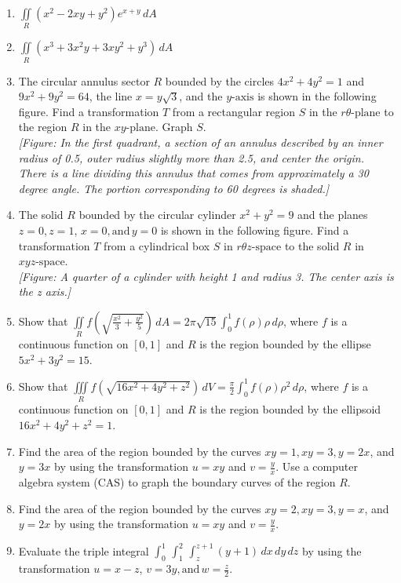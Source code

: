 \documentclass{exercises}
\begin{document}
\begin{enumerate}[resume]
\item $\underset{R}{\iint}(x^{2}-2xy+y^{2})e^{x+y}\,dA$
\item $\underset{R}{\iint}(x^{3}+3x^{2}y+3xy^{2}+y^{3})\,dA$
\item The circular annulus sector $R$ bounded by the circles $4x^{2}+4y^{2}=1$ and $9x^{2}+9y^{2}=64$, the line $x=y\sqrt{3}$, and the $y\text{-axis}$ is shown in the following figure. Find a transformation $T$ from a rectangular region $S$ in the $r\theta \text{-plane}$ to the region $R$ in the $xy\text{-plane.}$ Graph $S$. \\ \textit{[Figure: In the first quadrant, a section of an annulus described by an inner radius of 0.5, outer radius slightly more than 2.5, and center the origin. There is a line dividing this annulus that comes from approximately a 30 degree angle. The portion corresponding to 60 degrees is shaded.]}
\item The solid $R$ bounded by the circular cylinder $x^{2}+y^{2}=9$ and the planes $z=0,z=1$, $x=0,\text{and}\,y=0$ is shown in the following figure. Find a transformation $T$ from a cylindrical box $S$ in $r\theta z\text{-space}$ to the solid $R$ in $xyz\text{-space}$. \\ \textit{[Figure: A quarter of a cylinder with height 1 and radius 3. The center axis is the z axis.]}
\item Show that $\underset{R}{\iint}f(\sqrt{\frac{x^{2}}{3}+\frac{y^{2}}{5}})\,dA=2\pi \sqrt{15}\int_{0}^{1}f(\rho)\rho \,d\rho$, where $f$ is a continuous function on $[0,1]$ and $R$ is the region bounded by the ellipse $5x^{2}+3y^{2}=15$.
\item Show that $\underset{R}{\iiint}f(\sqrt{16x^{2}+4y^{2}+z^{2}})\,dV=\frac{\pi}{2}\int_{0}^{1}f(\rho)\rho^{2}\,d\rho$, where $f$ is a continuous function on $[0,1]$ and $R$ is the region bounded by the ellipsoid $16x^{2}+4y^{2}+z^{2}=1$.
\item \techrequired Find the area of the region bounded by the curves $xy=1,xy=3,y=2x$, and $y=3x$ by using the transformation $u=xy$ and $v=\frac{y}{x}$. Use a computer algebra system (CAS) to graph the boundary curves of the region $R$.
\item \techrequired Find the area of the region bounded by the curves $xy=2,xy=3,y=x$, and $y=2x$ by using the transformation $u=xy$ and $v=\frac{y}{x}$.
\item Evaluate the triple integral $\int_{0}^{1}\,\int_{1}^{2}\,\int_{z}^{z+1}(y+1)\,dx\,dy\,dz$ by using the transformation $u=x-z$, $v=3y,\text{and}\,w=\frac{z}{2}$.

\end{enumerate}
\end{document}
